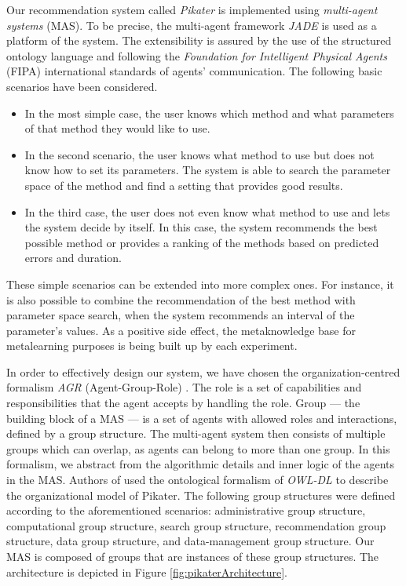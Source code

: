 Our recommendation system called \emph{Pikater} \cite{jaPikater, icmlaHawaii, wiat11, KazikIAENG} is implemented using \emph{multi-agent systems} (MAS). To be precise, the multi-agent framework \emph{JADE} \cite{JADE} is used as a platform of the system. The extensibility is assured by the use of the structured ontology language and following the \emph{Foundation for Intelligent Physical Agents} (FIPA) \cite{FIPA} international standards of agents' communication. The following basic scenarios have been considered.
\begin{itemize}
	\item In the most simple case, the user knows which method and what parameters of that method they would like to use.
	\item In the second scenario, the user knows what method to use but does not know how to set its parameters. The system is able to search the parameter space of the method and find a setting that provides good results. 
	\item In the third case, the user does not even know what method to use and lets the system decide by itself. In this case, the system recommends the best possible method or provides a ranking of the methods based on predicted errors and duration.
\end{itemize}
These simple scenarios can be extended into more complex ones. For instance, it is also possible to combine the recommendation of the best method with parameter space search, when the system recommends an interval of the parameter’s values. As a positive side effect, the metaknowledge base for metalearning purposes is being built up by each experiment. 

In order to effectively design our system, we have chosen the organization-centred formalism \emph{AGR} (Agent-Group-Role) \cite{agr}. The role is a set of capabilities and responsibilities that the agent accepts by handling the role. Group — the building block of a MAS — is a set of agents with allowed roles and interactions, defined by a group structure. The multi-agent system then consists of multiple groups which can overlap, as agents can belong to more than one group. In this formalism, we abstract from the algorithmic details and inner logic of the agents in the MAS. Authors of \cite{KazikIAENG} used the ontological formalism of \emph{OWL-DL} \cite{pelletOwlDl} to describe the organizational model of Pikater. The following group structures were defined according to the aforementioned scenarios: administrative group structure, computational group structure, search group structure, recommendation group structure, data group structure, and data-management group structure. Our MAS is composed of groups that are instances of these group structures. The architecture is depicted in Figure \ref{fig:pikaterArchitecture}.


